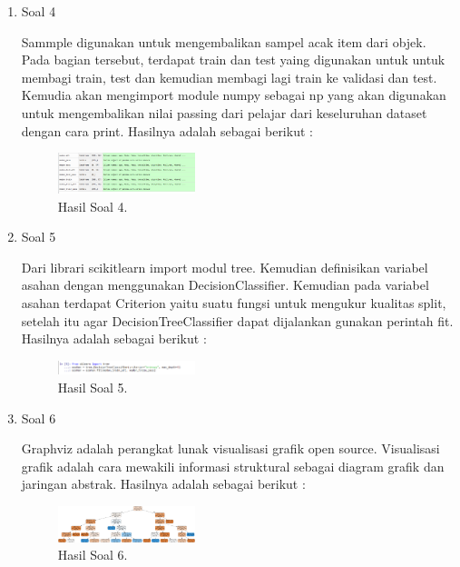 \begin{enumerate}
	\item Soal 4
	\hfill\break
	
	Sammple digunakan untuk mengembalikan sampel acak item dari objek. Pada bagian tersebut, terdapat train dan test yaing digunakan untuk untuk membagi train, test dan kemudian membagi lagi train ke validasi dan test. Kemudia akan mengimport module numpy sebagai np yang akan digunakan untuk mengembalikan nilai passing dari pelajar dari keseluruhan dataset dengan cara print. Hasilnya adalah sebagai berikut :
	\begin{figure}[H]
	\centering
		\includegraphics[width=4cm]{figures/1174021/tugas2/materi/hasil4.PNG}
		\caption{Hasil Soal 4.}
	\end{figure}

	\item Soal 5
	\hfill\break
	
	Dari librari scikitlearn import modul tree. Kemudian definisikan variabel asahan dengan menggunakan DecisionClassifier. Kemudian pada variabel asahan terdapat Criterion yaitu suatu fungsi untuk mengukur kualitas split, setelah itu agar DecisionTreeClassifier dapat dijalankan gunakan perintah fit. Hasilnya adalah sebagai berikut :
	\begin{figure}[H]
	\centering
		\includegraphics[width=4cm]{figures/1174021/tugas2/materi/hasil5.PNG}
		\caption{Hasil Soal 5.}
	\end{figure}

	\item Soal 6
	\hfill\break
	
	Graphviz adalah perangkat lunak visualisasi grafik open source. Visualisasi grafik adalah cara mewakili informasi struktural sebagai diagram grafik dan jaringan abstrak. Hasilnya adalah sebagai berikut :
	\begin{figure}[H]
	\centering
		\includegraphics[width=4cm]{figures/1174021/tugas2/materi/hasil6.PNG}
		\caption{Hasil Soal 6.}
	\end{figure}


\end{enumerate}
